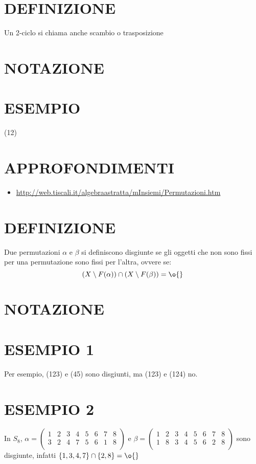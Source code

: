 \section{DEFINIZIONE}
Un 2-ciclo si chiama anche scambio o trasposizione

\section{NOTAZIONE}

\section{ESEMPIO}
(12)

\section{APPROFONDIMENTI}
\begin{itemize}
 \item \url{http://web.tiscali.it/algebraastratta/mInsiemi/Permutazioni.htm}
\end{itemize}




\section{DEFINIZIONE}
Due permutazioni $\alpha$ e $\beta$ si definiscono disgiunte se gli oggetti che non sono fissi per una permutazione
sono fissi per l'altra, ovvere se:
\[
 (X \setminus F(\alpha))\cap (X \setminus F(\beta))=\o{}
\]


\section{NOTAZIONE}

\section{ESEMPIO 1}
Per esempio, (123) e (45) sono disgiunti, ma (123) e (124) no. 

\section{ESEMPIO 2}
In $S_{8}$, $\alpha = \left( \begin{array}{cccccccc} 1 & 2 & 3 & 4 & 5 & 6 & 7 & 8 \\ 3 & 2 & 4 & 7 & 5 & 6 & 1 & 8 \\ \end{array} \right)$
e $\beta = \left( \begin{array}{cccccccc} 1 & 2 & 3 & 4 & 5 & 6 & 7 & 8 \\ 1 & 8 & 3 & 4 & 5 & 6 & 2 & 8 \\ \end{array} \right)$
sono disgiunte, infatti $\{ 1,3,4,7 \} \cap \{ 2,8 \} = \o{}$

